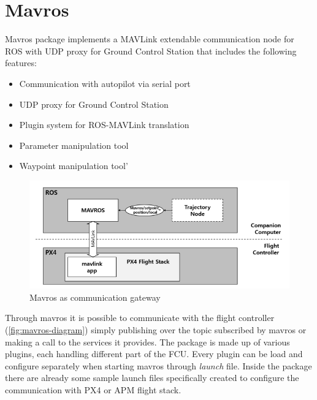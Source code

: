 
\chapter{Mavros} %
\label{appendix:mavros}
Mavros package implements a MAVLink extendable communication node for ROS with UDP proxy for Ground Control Station that includes the following features:
\begin{itemize}
	\item Communication with autopilot via serial port
	\item UDP proxy for Ground Control Station
	\item Plugin system for ROS-MAVLink translation
	\item Parameter manipulation tool
	\item Waypoint manipulation tool'
\end{itemize}

 \begin{figure}[ht]
    \centering
    \includegraphics[width=.7\textwidth]{figures/A3/diagram.png}
    \caption{Mavros as communication gateway}
    \label{fig:mavros-diagram}
\end{figure}
Through mavros it is possible to communicate with the flight controller (\autoref{fig:mavros-diagram}) simply publishing over the topic subscribed by mavros or making a call to the services it provides.
The package is made up of various plugins, each handling different part  of the FCU.
Every plugin can be load and configure separately when starting mavros through \textit{launch} file. Inside the package there are already some sample launch files specifically created to configure the communication with PX4 or APM flight stack.

